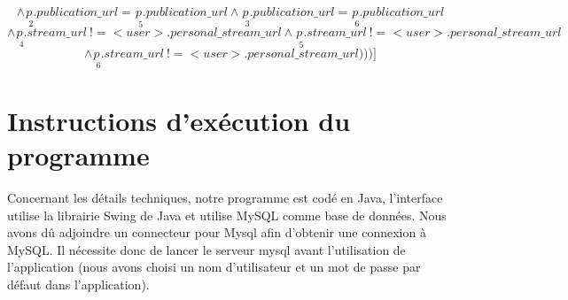 \documentclass[a4paper,10pt]{article}
\begin{document}
\begin{enumerate}
{\begin{minipage}{1.0\textwidth}
		\begin{equation}
		\wedge \underset{\ \ 2}{p}.publication\_url =  \underset{\ \ 5}{p}.publication\_url \wedge \underset{\ \ 3}{p}.publication\_url =  \underset{\ \ 6}{p}.publication\_url 
		\end{equation}
		\begin{equation}
		\wedge \underset{\ \ 4}{p}.stream\_url  \ !=  <user>.personal\_stream\_url \wedge \underset{\ \ 5}{p}.stream\_url  \ !=  <user>.personal\_stream\_url
		\end{equation}
		\begin{equation}
		\wedge \underset{\ \ 6}{p}.stream\_url  \ !=  <user>.personal\_stream\_url)))]
		\end{equation}
         \end{minipage}}
	\end{enumerate}

\section{Instructions d'exécution du programme}

Concernant les détails techniques, notre programme est codé en Java, l'interface utilise la librairie Swing de Java et utilise MySQL comme base de données. Nous avons dû adjoindre un connecteur pour Mysql afin d'obtenir une connexion à MySQL. Il nécessite donc de lancer le serveur mysql avant l'utilisation de l'application (nous avons choisi un nom d'utilisateur et un mot de passe par défaut dans l'application).
\end{document}
